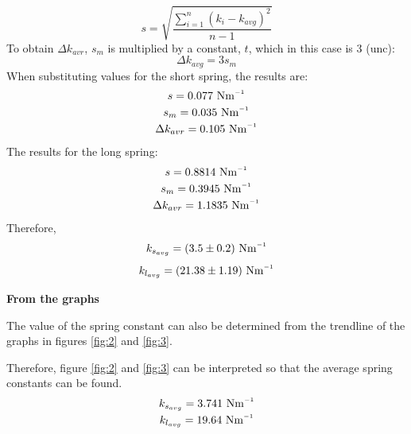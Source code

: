 \documentclass[a4paper, 10pt]{article}
\newcommand{\inv}{^{\raisebox{.2ex}{$\scriptscriptstyle-1$}}}
\newcommand{\unit}[1]{~\mathrm{#1}}
\begin{document}
\begin{justify}
\begin{equation}
s = \sqrt{\frac{\sum_{i=1}^{n}(k_i-k_{avg})^2}{n-1}}
\end{equation}
To obtain $\Delta k_{avr}$, $s_m$ is multiplied by a constant, $t$, which in
this case is 3 (unc):
\begin{equation}
    \Delta k_{avg} = 3s_m
\end{equation}
When substituting values for the short spring, the results are:
\begin{gather*}
    s = 0.077\unit{N m\inv}\\
    s_m = 0.035\unit{N m\inv}\\
    \Delta k_{avr} = 0.105\unit{N m\inv}
\end{gather*}
The results for the long spring:
\begin{gather*}
    s = 0.8814\unit{N m\inv}\\
    s_m = 0.3945\unit{N m\inv}\\
    \Delta k_{avr} = 1.1835\unit{Nm\inv}
\end{gather*}
Therefore,
\[ k_{s_{avg}} = (3.5 \pm 0.2)\unit{Nm\inv}\]
\[k_{l_{avg}} = (21.38 \pm 1.19)\unit{Nm\inv}\]
\par
\textbf{From the graphs}
\par
The value of the spring constant can also be determined from the trendline of
the graphs in figures \ref{fig:2} and \ref{fig:3}.
\par
Therefore, figure \ref{fig:2} and \ref{fig:3} can be interpreted so that the
average spring constants can be found.
\begin{gather*}
 k_{s_{avg}} = 3.741\unit{Nm\inv}\\
 k_{l_{avg}} = 19.64\unit{Nm\inv}
\end{gather*}
\newpage

\end{justify}
\end{document}
